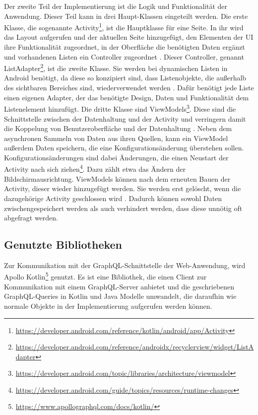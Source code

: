 Der zweite Teil der Implementierung ist die Logik und Funktionalität der Anwendung. Dieser Teil kann in drei Haupt-Klassen eingeteilt werden. 
Die erste Klasse, die sogenannte Activity\footnote{\url{https://developer.android.com/reference/kotlin/android/app/Activity}}, ist die Hauptklasse für eine Seite. In ihr wird das Layout aufgerufen und der aktuellen Seite hinzugefügt, den Elementen der UI ihre Funktionalität zugeordnet, in der Oberfläche die benötigten Daten ergänzt und vorhandenen Listen ein Controller zugeordnet \cite{sarkar_android}.
Dieser Controller, genannt ListAdapter\footnote{\url{https://developer.android.com/reference/androidx/recyclerview/widget/ListAdapter}}, ist die zweite Klasse. Sie werden bei dynamischen Listen in Android benötigt, da diese so konzipiert sind, dass Listenobjekte, die außerhalb des sichtbaren Bereiches sind, wiederverwendet werden \cite{recyclerview_android}. Dafür benötigt jede Liste einen eigenen Adapter, der das benötigte Design, Daten und Funktionalität dem Listenelement hinzufügt.
Die dritte Klasse sind ViewModels\footnote{\url{https://developer.android.com/topic/libraries/architecture/viewmodel}}. Diese sind die Schnittstelle zwischen der Datenhaltung und der Activity und verringern damit die Koppelung von Benutzeroberfläche und der Datenhaltung \cite{viewModel_android}. Neben dem asynchronen Sammeln von Daten aus ihren Quellen, kann ein ViewModel außerdem Daten speichern, die eine Konfigurationsänderung überstehen sollen. Konfigurationsänderungen sind dabei Änderungen, die einen Neustart der Activity nach sich ziehen\footnote{\url{https://developer.android.com/guide/topics/resources/runtime-changes}}. Dazu zählt etwa das Ändern der Bildschirmausrichtung. ViewModels können nach dem erneuten Bauen der Activity, dieser wieder hinzugefügt werden. Sie werden erst gelöscht, wenn die dazugehörige Activity geschlossen wird \cite{Android_Room}. Dadurch können sowohl Daten zwischengespeichert werden als auch verhindert werden, dass diese unnötig oft abgefragt werden.


\subsection{Genutzte Bibliotheken}
\label{cha:4_1_bibliothek}
Zur Kommunikation mit der GraphQL-Schnittstelle der Web-Anwendung, wird Apollo Kotlin\footnote{\url{https://www.apollographql.com/docs/kotlin/}} genutzt. 
Es ist eine Bibliothek, die einen Client zur Kommunikation mit einem GraphQL-Server anbietet und die geschriebenen GraphQL-Queries in Kotlin und Java Modelle umwandelt, die daraufhin wie normale Objekte in der Implementierung aufgerufen werden können.

